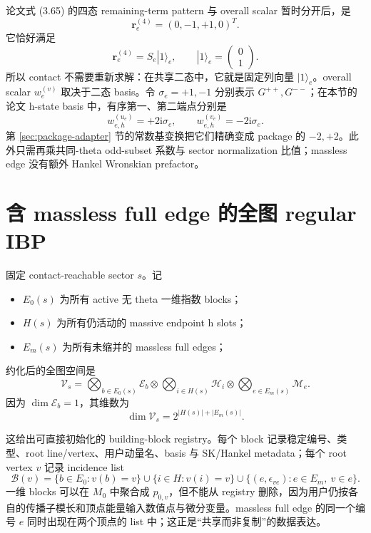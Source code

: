 \documentclass[11pt,a4paper]{ctexart}
\newcommand{\ii}{\mathrm i}
\newcommand{\cV}{\mathcal V}
\newcommand{\cE}{\mathcal E}
\newcommand{\cH}{\mathcal H}
\newcommand{\cM}{\mathcal M}
\newcommand{\cB}{\mathcal B}
\begin{document}
论文式 (3.65) 的四态 remaining-term pattern 与 overall scalar 暂时分开后，是
\begin{equation}
 \bm r_e^{(4)}=(0,-1,+1,0)^T.
\end{equation}
它恰好满足
\begin{equation}
 \bm r_e^{(4)}=S_e|1\rangle_e,
 \qquad
 |1\rangle_e=\begin{pmatrix}0\\1\end{pmatrix}.
 \label{eq:contact-vector-projection}
\end{equation}
所以 contact 不需要重新求解：在共享二态中，它就是固定列向量 $|1\rangle_e$。overall scalar $w_e^{(v)}$ 取决于二态 basis。令 $\sigma_e=+1,-1$ 分别表示 $G^{++},G^{--}$；在本节的论文 h-state basis 中，有序第一、第二端点分别是
\begin{equation}
 w_{e,h}^{(u_e)}=+2\ii\sigma_e,
 \qquad
 w_{e,h}^{(v_e)}=-2\ii\sigma_e.
 \label{eq:h-massless-contact-weight}
\end{equation}
第 \ref{sec:package-adapter} 节的常数基变换把它们精确变成 package 的 $-2,+2$。此外只需再乘共同-theta odd-subset 系数与 sector normalization 比值；massless edge 没有额外 Hankel Wronskian prefactor。

\section{含 massless full edge 的全图 regular IBP}

固定 contact-reachable sector $s$。记
\begin{itemize}
  \item $E_0(s)$ 为所有 active 无 theta 一维指数 blocks；
  \item $H(s)$ 为所有仍活动的 massive endpoint h slots；
  \item $E_m(s)$ 为所有未缩并的 massless full edges；
\end{itemize}
约化后的全图空间是
\begin{equation}
 \boxed{
 \cV_s
 =\bigotimes_{b\in E_0(s)}\cE_b
 \otimes\bigotimes_{i\in H(s)}\cH_i
 \otimes\bigotimes_{e\in E_m(s)}\cM_e.
 }
 \label{eq:global-reduced-space}
\end{equation}
因为 $\dim\cE_b=1$，其维数为
\begin{equation}
 \dim\cV_s=2^{|H(s)|+|E_m(s)|}.
\end{equation}

这给出可直接初始化的 building-block registry。每个 block 记录稳定编号、类型、root line/vertex、用户动量名、basis 与 SK/Hankel metadata；每个 root vertex $v$ 记录 incidence list
\begin{equation}
 \cB(v)=
 \{b\in E_0:v(b)=v\}
 \cup\{i\in H:v(i)=v\}
 \cup\{(e,\epsilon_{ve}):e\in E_m,\ v\in e\}.
 \label{eq:vertex-block-incidence}
\end{equation}
一维 blocks 可以在 $M_0$ 中聚合成 $p_{0,v}$，但不能从 registry 删除，因为用户仍按各自的传播子模长和顶点能量输入数值点与微分变量。massless full edge 的同一个编号 $e$ 同时出现在两个顶点的 list 中；这正是“共享而非复制”的数据表达。
\end{document}
